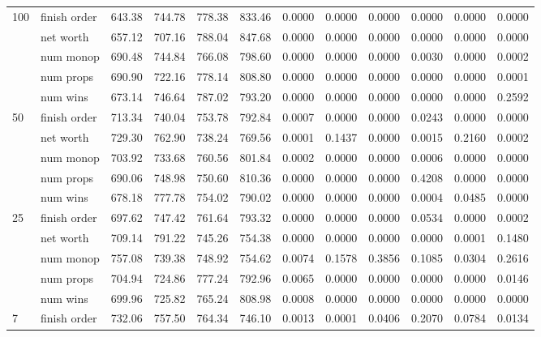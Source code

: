 \begin{landscape}
\begin{table}[ht]
\begin{tabularx}{\linewidth}{|p{1in}|p{1in}|r|r|r|r|r|r|r|r|r|r|}
      \multirow{5}{*}{100} & finish order & 643.38 & 744.78 & 778.38 & 833.46 & 0.0000 & 0.0000 & 0.0000 & 0.0000 & 0.0000 & 0.0000 \\
\cline{2-12}       & net worth & 657.12 & 707.16 & 788.04 & 847.68 & 0.0000 & 0.0000 & 0.0000 & 0.0000 & 0.0000 & 0.0000 \\
\cline{2-12}       & num monop & 690.48 & 744.84 & 766.08 & 798.60 & 0.0000 & 0.0000 & 0.0000 & 0.0030 & 0.0000 & 0.0002 \\
\cline{2-12}       & num props & 690.90 & 722.16 & 778.14 & 808.80 & 0.0000 & 0.0000 & 0.0000 & 0.0000 & 0.0000 & 0.0001 \\
\cline{2-12}       & num wins & 673.14 & 746.64 & 787.02 & 793.20 & 0.0000 & 0.0000 & 0.0000 & 0.0000 & 0.0000 & 0.2592 \\
      \cline{1-12}
      \multirow{5}{*}{50} & finish order & 713.34 & 740.04 & 753.78 & 792.84 & 0.0007 & 0.0000 & 0.0000 & 0.0243 & 0.0000 & 0.0000 \\
\cline{2-12}       & net worth & 729.30 & 762.90 & 738.24 & 769.56 & 0.0001 & 0.1437 & 0.0000 & 0.0015 & 0.2160 & 0.0002 \\
\cline{2-12}       & num monop & 703.92 & 733.68 & 760.56 & 801.84 & 0.0002 & 0.0000 & 0.0000 & 0.0006 & 0.0000 & 0.0000 \\
\cline{2-12}       & num props & 690.06 & 748.98 & 750.60 & 810.36 & 0.0000 & 0.0000 & 0.0000 & 0.4208 & 0.0000 & 0.0000 \\
\cline{2-12}       & num wins & 678.18 & 777.78 & 754.02 & 790.02 & 0.0000 & 0.0000 & 0.0000 & 0.0004 & 0.0485 & 0.0000 \\
      \cline{1-12}
      \multirow{5}{*}{25} & finish order & 697.62 & 747.42 & 761.64 & 793.32 & 0.0000 & 0.0000 & 0.0000 & 0.0534 & 0.0000 & 0.0002 \\
\cline{2-12}       & net worth & 709.14 & 791.22 & 745.26 & 754.38 & 0.0000 & 0.0000 & 0.0000 & 0.0000 & 0.0001 & 0.1480 \\
\cline{2-12}       & num monop & 757.08 & 739.38 & 748.92 & 754.62 & 0.0074 & 0.1578 & 0.3856 & 0.1085 & 0.0304 & 0.2616 \\
\cline{2-12}       & num props & 704.94 & 724.86 & 777.24 & 792.96 & 0.0065 & 0.0000 & 0.0000 & 0.0000 & 0.0000 & 0.0146 \\
\cline{2-12}       & num wins & 699.96 & 725.82 & 765.24 & 808.98 & 0.0008 & 0.0000 & 0.0000 & 0.0000 & 0.0000 & 0.0000 \\
      \cline{1-12}
      \multirow{5}{*}{7} & finish order & 732.06 & 757.50 & 764.34 & 746.10 & 0.0013 & 0.0001 & 0.0406 & 0.2070 & 0.0784 & 0.0134 \\

\end{tabularx}
\end{table}
\end{landscape}
